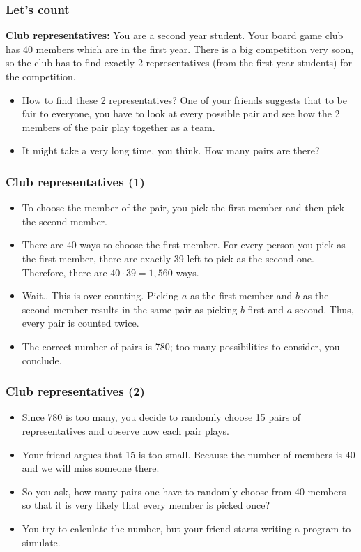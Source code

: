 

\begin{frame}\frametitle{Let's count}
  \begin{tcolorbox}
    {\bf Club representatives:} You are a second year student. Your
    board game club has 40 members which are in the first year.  There
    is a big competition very soon, so the club has to find exactly 2
    representatives (from the first-year students) for the competition.
  \end{tcolorbox}
  \pause

  \begin{itemize}
  \item
    How to find these 2 representatives?  One of your friends suggests
    that to be fair to everyone, you have to look at every possible
    pair and see how the 2 members of the pair play together as a
    team.  \pause
  \item
    It might take a very long time, you think.  How many pairs are
    there?
  \end{itemize}
\end{frame}

\begin{frame}\frametitle{Club representatives (1)}
  \begin{itemize}
  \item
    To choose the member of the pair, you pick the first member and then
    pick the second member.  \pause
  \item There are 40 ways to choose the
    first member. \pause For every person you pick as the first member,
    there are exactly 39 left to pick as the second one. \pause
    Therefore, there are $40\cdot 39 = 1,560$ ways.  \pause
  \item
    Wait.. \pause This is over counting.  Picking $a$ as the first
    member and $b$ as the second member results in the same pair as
    picking $b$ first and $a$ second. \pause Thus, every pair is counted
    twice.  \pause
  \item The correct number of pairs is 780; too many possibilities to
    consider, you conclude.
  \end{itemize}
\end{frame}

\begin{frame}\frametitle{Club representatives (2)}
  \begin{itemize}
  \item Since 780 is too many, you decide to randomly choose 15 pairs
    of representatives and observe how each pair plays.
    \pause
  \item Your friend argues that 15 is too small.  Because the number of
    members is 40 and we will miss someone there.
    \pause
  \item So you ask, how many pairs one have to randomly choose from 40
    members so that it is very likely that every member is picked
    once?  \pause
  \item You try to calculate the number, but your friend starts
    writing a program to simulate.
  \end{itemize}
\end{frame}

